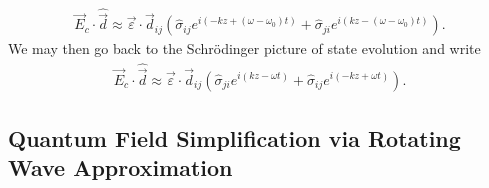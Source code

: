 \documentclass[aps,pra,showpacs,amsmath,amssymb,nofootinbib,longbibliography,superscriptaddress
]{revtex4-1}
\theoremstyle{definition}
\theoremstyle{remark}
\newcommand{\0}{\hat{0}}
\begin{document}
\begin{align}
    \vec{E}_c \cdot \hat{\vec{d}} \approx 
    \vec{\varepsilon} \cdot \vec{d}_{ij} \left(
        \hat{\sigma}_{ij} e^{i(-kz + (\omega - \omega_0) t)} +
        \hat{\sigma}_{ji} e^{i(kz - (\omega - \omega_0) t)}
    \right).
\end{align}
We may then go back to the Schr\"{o}dinger picture of state evolution and write
\begin{align}
    \vec{E}_c \cdot \hat{\vec{d}} \approx 
    \vec{\varepsilon} \cdot \vec{d}_{ij} \left(
        \hat{\sigma}_{ji} e^{i(kz - \omega t)} +
        \hat{\sigma}_{ij} e^{i(-kz + \omega t)}
    \right).
\end{align}

\subsection{Quantum Field Simplification via Rotating Wave Approximation}
\end{document}
